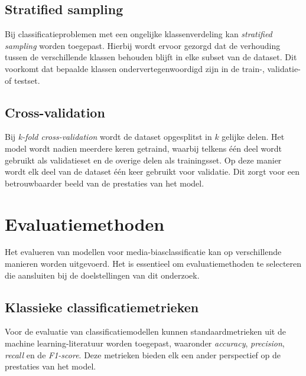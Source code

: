 \subsection{Stratified sampling}

Bij classificatieproblemen met een ongelijke klassenverdeling kan \textit{stratified sampling} worden toegepast. Hierbij wordt ervoor gezorgd dat de verhouding tussen de verschillende klassen behouden blijft in elke subset van de dataset. Dit voorkomt dat bepaalde klassen ondervertegenwoordigd zijn in de train-, validatie- of testset.

\subsection{Cross-validation}

Bij \textit{k-fold cross-validation} wordt de dataset opgesplitst in $k$ gelijke delen. Het model wordt nadien meerdere keren getraind, waarbij telkens één deel wordt gebruikt als validatieset en de overige delen als trainingsset. Op deze manier wordt elk deel van de dataset één keer gebruikt voor validatie. Dit zorgt voor een betrouwbaarder beeld van de prestaties van het model.

\section{Evaluatiemethoden}
\label{sec:evaluatiemethoden}

Het evalueren van modellen voor media-biasclassificatie kan op verschillende manieren worden uitgevoerd. Het is essentieel om evaluatiemethoden te selecteren die aansluiten bij de doelstellingen van dit onderzoek.

\subsection{Klassieke classificatiemetrieken}

Voor de evaluatie van classificatiemodellen kunnen standaardmetrieken uit de machine learning-literatuur worden toegepast, waaronder \textit{accuracy}, \textit{precision}, \textit{recall} en de \textit{F1-score}. Deze metrieken bieden elk een ander perspectief op de prestaties van het model.

